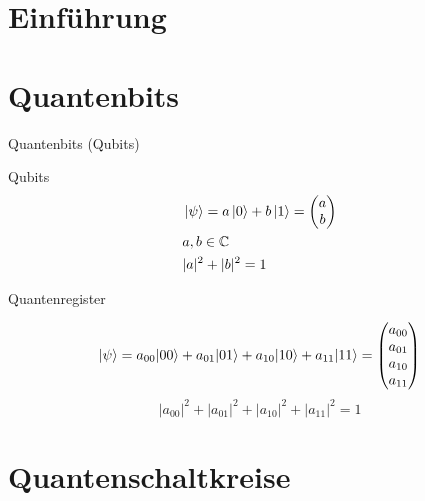 \documentclass[xcolor=colortbl
]{beamer}
\begin{document}
\maketitle

\begin{frame}
    \tableofcontents
\end{frame}

\section{Einführung}

\section{Quantenbits}
\begin{frame}{Quantenbits (Qubits)}
    \begin{definition}{Qubits}
        \begin{align*}
        &\left|\psi\right\rangle = a \left|0\right\rangle + b \left|1\right\rangle = \begin{pmatrix} a \\ b \end{pmatrix}  \\
        &a, b \in \mathbb C \\
        &|a|^2 + |b|^2 = 1
        \end{align*}
    \end{definition}
\end{frame}

\begin{frame}{Quantenregister}
    \begin{example}
    \[
        \left|\psi\right\rangle = a_{00} |00\rangle + a_{01} |01\rangle + a_{10} |10\rangle + a_{11} |11\rangle = 
    \begin{pmatrix}
        a_{00}  \\
        a_{01}  \\
        a_{10}  \\
        a_{11}  \\
    \end{pmatrix}
    \]
    \[
        |a_{00}|^2 + |a_{01}|^2 + |a_{10}|^2 + |a_{11}|^2 = 1
    \]
    \end{example}
\end{frame}

\section{Quantenschaltkreise}
\end{document}
